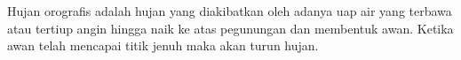 Hujan orografis adalah hujan yang diakibatkan oleh adanya uap air yang terbawa atau tertiup angin hingga naik ke atas pegunungan dan membentuk awan. Ketika awan telah mencapai titik jenuh maka akan turun hujan.